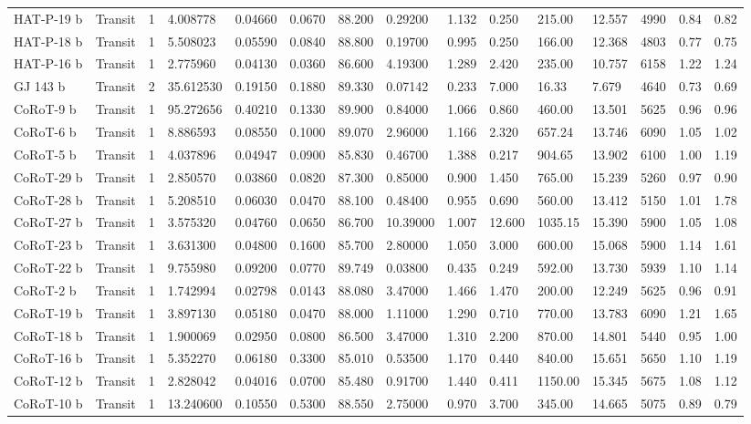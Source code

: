 \documentclass[11pt]{article}
\begin{document}
\begin{tabular}{lllllllllllllll}
	 HAT-P-19 b & Transit & 1 &  4.008778 & 0.04660 & 0.0670 & 88.200 &  0.29200 & 1.132 &  0.250 &  215.00 & 12.557 & 4990 & 0.84 & 0.82\\
	 HAT-P-18 b & Transit & 1 &  5.508023 & 0.05590 & 0.0840 & 88.800 &  0.19700 & 0.995 &  0.250 &  166.00 & 12.368 & 4803 & 0.77 & 0.75\\
	 HAT-P-16 b & Transit & 1 &  2.775960 & 0.04130 & 0.0360 & 86.600 &  4.19300 & 1.289 &  2.420 &  235.00 & 10.757 & 6158 & 1.22 & 1.24\\
	 GJ 143 b   & Transit & 2 & 35.612530 & 0.19150 & 0.1880 & 89.330 &  0.07142 & 0.233 &  7.000 &   16.33 &  7.679 & 4640 & 0.73 & 0.69\\
	 CoRoT-9 b  & Transit & 1 & 95.272656 & 0.40210 & 0.1330 & 89.900 &  0.84000 & 1.066 &  0.860 &  460.00 & 13.501 & 5625 & 0.96 & 0.96\\
	 CoRoT-6 b  & Transit & 1 &  8.886593 & 0.08550 & 0.1000 & 89.070 &  2.96000 & 1.166 &  2.320 &  657.24 & 13.746 & 6090 & 1.05 & 1.02\\
	 CoRoT-5 b  & Transit & 1 &  4.037896 & 0.04947 & 0.0900 & 85.830 &  0.46700 & 1.388 &  0.217 &  904.65 & 13.902 & 6100 & 1.00 & 1.19\\
	 CoRoT-29 b & Transit & 1 &  2.850570 & 0.03860 & 0.0820 & 87.300 &  0.85000 & 0.900 &  1.450 &  765.00 & 15.239 & 5260 & 0.97 & 0.90\\
	 CoRoT-28 b & Transit & 1 &  5.208510 & 0.06030 & 0.0470 & 88.100 &  0.48400 & 0.955 &  0.690 &  560.00 & 13.412 & 5150 & 1.01 & 1.78\\
	 CoRoT-27 b & Transit & 1 &  3.575320 & 0.04760 & 0.0650 & 86.700 & 10.39000 & 1.007 & 12.600 & 1035.15 & 15.390 & 5900 & 1.05 & 1.08\\
	 CoRoT-23 b & Transit & 1 &  3.631300 & 0.04800 & 0.1600 & 85.700 &  2.80000 & 1.050 &  3.000 &  600.00 & 15.068 & 5900 & 1.14 & 1.61\\
	 CoRoT-22 b & Transit & 1 &  9.755980 & 0.09200 & 0.0770 & 89.749 &  0.03800 & 0.435 &  0.249 &  592.00 & 13.730 & 5939 & 1.10 & 1.14\\
	 CoRoT-2 b  & Transit & 1 &  1.742994 & 0.02798 & 0.0143 & 88.080 &  3.47000 & 1.466 &  1.470 &  200.00 & 12.249 & 5625 & 0.96 & 0.91\\
	 CoRoT-19 b & Transit & 1 &  3.897130 & 0.05180 & 0.0470 & 88.000 &  1.11000 & 1.290 &  0.710 &  770.00 & 13.783 & 6090 & 1.21 & 1.65\\
	 CoRoT-18 b & Transit & 1 &  1.900069 & 0.02950 & 0.0800 & 86.500 &  3.47000 & 1.310 &  2.200 &  870.00 & 14.801 & 5440 & 0.95 & 1.00\\
	 CoRoT-16 b & Transit & 1 &  5.352270 & 0.06180 & 0.3300 & 85.010 &  0.53500 & 1.170 &  0.440 &  840.00 & 15.651 & 5650 & 1.10 & 1.19\\
	 CoRoT-12 b & Transit & 1 &  2.828042 & 0.04016 & 0.0700 & 85.480 &  0.91700 & 1.440 &  0.411 & 1150.00 & 15.345 & 5675 & 1.08 & 1.12\\
	 CoRoT-10 b & Transit & 1 & 13.240600 & 0.10550 & 0.5300 & 88.550 &  2.75000 & 0.970 &  3.700 &  345.00 & 14.665 & 5075 & 0.89 & 0.79\\
\end{tabular}
\end{document}
